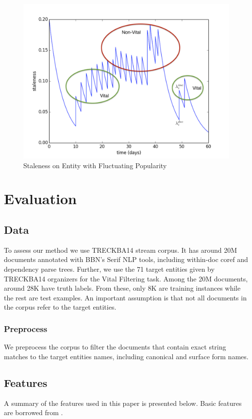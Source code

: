 \documentclass{article}
\begin{document}
\begin{figure}[h!]
\centering
\includegraphics[width=.5\textwidth]{staleness2.pdf}
\caption{Staleness on Entity with Fluctuating Popularity}
\label{stalenessmedium}
\end{figure}


\section{Evaluation}
\label{evaluation}

\subsection{Data}
\label{data}

To assess our method we use TRECKBA14 stream corpus. It has around 20M documents annotated with BBN's Serif NLP tools, including within-doc coref and dependency parse trees. Further, we use the 71 target entities given by TRECKBA14 organizers for the Vital Filtering task. Among the 20M documents, around 28K have truth labels. From these, only 8K are training instances while the rest are test examples. An important assumption is that not all documents in the corpus refer to the target entities.

\subsubsection{Preprocess}

We preprocess the corpus to filter the documents that contain exact string matches to the target entities names, including canonical and surface form names.

\subsection{Features}
\label{feat}

A summary of the features used in this paper is presented below. Basic features are borrowed from \cite{jingang13}.
\end{document}
